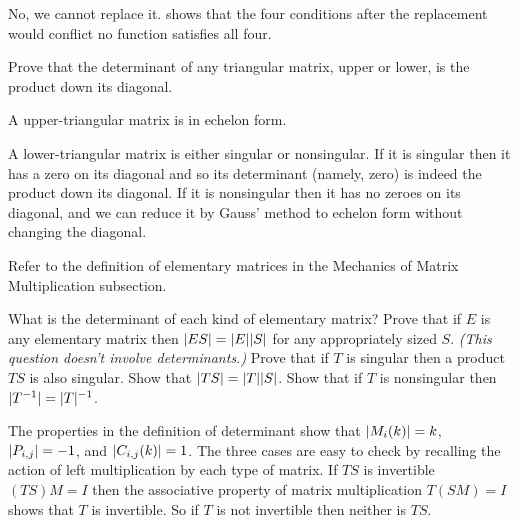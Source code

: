 \begin{exercises}
     \begin{answer}
       No, we cannot replace it.
       shows that the four conditions after the replacement would  
       conflict \Dash  no function satisfies all four.
     \end{answer}
  \item 
    Prove that the determinant of any triangular matrix, upper or lower,
    is the product down its diagonal.
    \begin{answer}
      A upper-triangular matrix is in echelon form.

      A lower-triangular matrix is either singular or nonsingular.
      If it is singular then it has a zero on its diagonal and so its 
      determinant (namely, zero) is indeed the product down its diagonal. 
      If it is nonsingular then it has no zeroes on its diagonal, and
      we can reduce it by Gauss' method to echelon
      form without changing the diagonal.  
    \end{answer}
  \item
    Refer to the definition of elementary matrices in the Mechanics
    of Matrix Multiplication subsection.
    \begin{exparts}
      \partsitem What is the determinant of each kind of elementary matrix?
      \partsitem Prove that if \( E \) is any elementary matrix then
        \( \deter{ES}=\deter{E}\deter{S} \) for any appropriately sized
        \( S \).
      \partsitem \textit{(This question doesn't involve determinants.)}
        Prove that if \( T \) is singular then a product \( TS \) is
        also singular.
      \partsitem Show that \( \deter{TS}=\deter{T}\deter{S} \).
      \partsitem Show that if \( T \) is nonsingular then
          \( \deter{T^{-1}}=\deter{T}^{-1} \).
    \end{exparts}
    \begin{answer}
      \begin{exparts}
        \partsitem The properties in the definition of determinant 
          show that 
          \( \deter{M_i(k)}=k \),
          \( \deter{P_{i,j}}=-1 \),
          and
          \( \deter{C_{i,j}(k)}=1 \).
        \partsitem The three cases are easy to check by recalling the action
          of left multiplication by each type of matrix.
        \partsitem If \( TS \) is invertible \( (TS)M=I \) then
          the associative property of matrix multiplication 
          \( T(SM)=I \) shows that \( T \) is invertible.
          So if \( T \) is not invertible then neither is \( TS \).

\end{exparts}
\end{answer}
\end{exercises}

